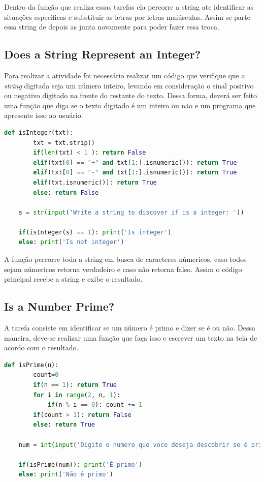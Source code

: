 Dentro da função que realiza essas tarefas ela percorre a string ate identificar as situações especificas e substituir as letras por letras maiúsculas. Assim se parte essa string de depois as junta novamente para poder fazer essa troca.

\subsection{Does a String Represent an Integer?}

Para realizar a atividade foi necessário realizar um código que verifique que a \textit{string} digitada seja um número inteiro, levando em consideração o sinal positivo ou negativo digitado na frente do restante do texto. Dessa forma, deverá ser feito uma função que diga se o texto digitado é um inteiro ou não e um programa que apresente isso ao usuário.

\begin{lstlisting}[language=Python]
    def isInteger(txt):
        txt = txt.strip()
        if(len(txt) < 1 ): return False
        elif(txt[0] == "+" and txt[1:].isnumeric()): return True
        elif(txt[0] == "-" and txt[1:].isnumeric()): return True
        elif(txt.isnumeric()): return True
        else: return False

    s = str(input('Write a string to discover if is a integer: '))

    if(isInteger(s) == 1): print('Is integer')
    else: print('Is not integer')
\end{lstlisting}

A função percorre toda a string em busca de caracteres númericos, caso todos sejam númericos retorna verdadeiro e caso não retorna falso. Assim o código principal recebe a string e exibe o resultado.

\subsection{Is a Number Prime?}

A tarefa consiste em identificar se um número é primo e dizer se é ou não. Dessa maneira, deve-se realizar uma função que faça isso e escrever um texto na tela de acordo com o resultado.

\begin{lstlisting}[language=Python]
    def isPrime(n):
        count=0
        if(n == 1): return True
        for i in range(2, n, 1):
            if(n % i == 0): count += 1
        if(count > 1): return False
        else: return True

    num = int(input('Digite o numero que voce deseja descobrir se é primo: '))

    if(isPrime(num)): print('É primo')
    else: print('Não é primo')

\end{lstlisting}

